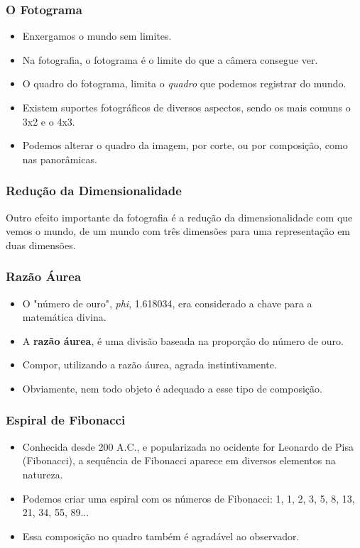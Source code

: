 \begin{frame}
    \frametitle{O Fotograma}
    \begin{itemize}
      \item Enxergamos o mundo sem limites.
      \item Na fotografia, o fotograma é o limite do que a câmera consegue ver.
      \item O quadro do fotograma, limita o \textit{quadro} que podemos registrar do mundo.
      \item Existem suportes fotográficos de diversos aspectos, sendo os mais comuns o 3x2 e o 4x3.
      \item Podemos alterar o quadro da imagem, por corte, ou por composição, como nas panorâmicas.
    \end{itemize}
\end{frame}

\begin{frame}
    \frametitle{Redução da Dimensionalidade}
    Outro efeito importante da fotografia é a redução da dimensionalidade com que vemos o mundo,
    de um mundo com três dimensões para uma representação em duas dimensões.
\end{frame}

\begin{frame}
    \frametitle{Razão Áurea}
    \begin{itemize}
      \item O "número de ouro", \textit{phi}, 1.618034, era considerado a chave
      para a matemática divina.
      \item A \textbf{razão áurea}, é uma divisão baseada na proporção do número de ouro.
      \item Compor, utilizando a razão áurea, agrada instintivamente.
      \item Obviamente, nem todo objeto é adequado a esse tipo de composição.
    \end{itemize}
\end{frame}


\begin{frame}
    \frametitle{Espiral de Fibonacci}
    \begin{itemize}
      \item Conhecida desde 200 A.C., e popularizada no ocidente for Leonardo de Pisa (Fibonacci),
      a sequência de Fibonacci aparece em diversos elementos na natureza.
      \item Podemos criar uma espiral com os números de Fibonacci: 1, 1, 2, 3, 5, 8, 13, 21, 34, 55, 89...
      \item Essa composição no quadro também é agradável ao observador.
    \end{itemize}
\end{frame}

